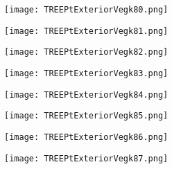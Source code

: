 \documentclass[pdf]{beamer}
\begin{document}
\begin{frame}
\begin{figure}[!h]
\centering
\texttt{[image: TREEPtExteriorVegk80.png]}
\end{figure}
\end{frame}

\begin{frame}
\begin{figure}[!h]
\centering
\texttt{[image: TREEPtExteriorVegk81.png]}
\end{figure}
\end{frame}

\begin{frame}
\begin{figure}[!h]
\centering
\texttt{[image: TREEPtExteriorVegk82.png]}
\end{figure}
\end{frame}

\begin{frame}
\begin{figure}[!h]
\centering
\texttt{[image: TREEPtExteriorVegk83.png]}
\end{figure}
\end{frame}

\begin{frame}
\begin{figure}[!h]
\centering
\texttt{[image: TREEPtExteriorVegk84.png]}
\end{figure}
\end{frame}

\begin{frame}
\begin{figure}[!h]
\centering
\texttt{[image: TREEPtExteriorVegk85.png]}
\end{figure}
\end{frame}

\begin{frame}
\begin{figure}[!h]
\centering
\texttt{[image: TREEPtExteriorVegk86.png]}
\end{figure}
\end{frame}

\begin{frame}
\begin{figure}[!h]
\centering
\texttt{[image: TREEPtExteriorVegk87.png]}
\end{figure}
\end{frame}
\end{document}
